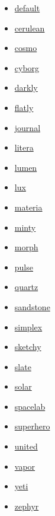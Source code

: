 \documentclass[
  letterpaper,
]{book}
\providecommand{\tightlist}{%
  \setlength{\itemsep}{0pt}\setlength{\parskip}{0pt}}\usepackage{longtable,booktabs,array}
\begin{document}
\begin{itemize}
\begin{itemize}
    \begin{itemize}
    \tightlist
    \item
      \href{https://bootswatch.com/default/}{default}
    \item
      \href{https://bootswatch.com/cerulean/}{cerulean}
    \item
      \href{https://bootswatch.com/cosmo/}{cosmo}
    \item
      \href{https://bootswatch.com/cyborg/}{cyborg}
    \item
      \href{https://bootswatch.com/darkly/}{darkly}
    \item
      \href{https://bootswatch.com/flatly/}{flatly}
    \item
      \href{https://bootswatch.com/journal/}{journal}
    \item
      \href{https://bootswatch.com/litera/}{litera}
    \item
      \href{https://bootswatch.com/lumen/}{lumen}
    \item
      \href{https://bootswatch.com/lux/}{lux}
    \item
      \href{https://bootswatch.com/materia/}{materia}
    \item
      \href{https://bootswatch.com/minty/}{minty}
    \item
      \href{https://bootswatch.com/morph/}{morph}
    \item
      \href{https://bootswatch.com/pulse/}{pulse}
    \item
      \href{https://bootswatch.com/quartz/}{quartz}
    \item
      \href{https://bootswatch.com/sandstone/}{sandstone}
    \item
      \href{https://bootswatch.com/simplex/}{simplex}
    \item
      \href{https://bootswatch.com/sketchy/}{sketchy}
    \item
      \href{https://bootswatch.com/slate/}{slate}
    \item
      \href{https://bootswatch.com/solar/}{solar}
    \item
      \href{https://bootswatch.com/spacelab/}{spacelab}
    \item
      \href{https://bootswatch.com/superhero/}{superhero}
    \item
      \href{https://bootswatch.com/united/}{united}
    \item
      \href{https://bootswatch.com/vapor/}{vapor}
    \item
      \href{https://bootswatch.com/yeti/}{yeti}
    \item
      \href{https://bootswatch.com/zephyr/}{zephyr}
    \end{itemize}
  \end{itemize}
\end{itemize}
\end{document}
